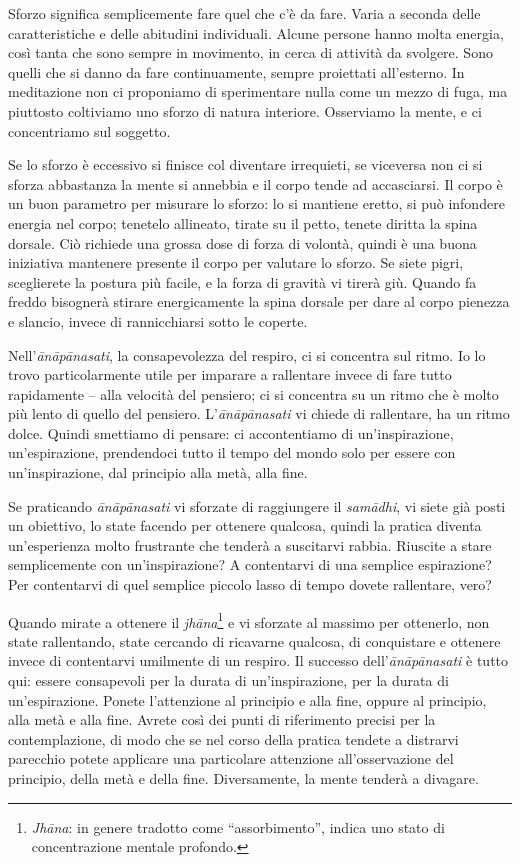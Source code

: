 
Sforzo significa semplicemente fare quel che c'è da fare. Varia a
seconda delle caratteristiche e delle abitudini individuali. Alcune
persone hanno molta energia, così tanta che sono sempre in movimento, in
cerca di attività da svolgere. Sono quelli che si danno da fare
continuamente, sempre proiettati all'esterno. In meditazione non ci
proponiamo di sperimentare nulla come un mezzo di fuga, ma piuttosto
coltiviamo uno sforzo di natura interiore. Osserviamo la mente, e ci
concentriamo sul soggetto.

Se lo sforzo è eccessivo si finisce col diventare irrequieti, se
viceversa non ci si sforza abbastanza la mente si annebbia e il corpo
tende ad accasciarsi. Il corpo è un buon parametro per misurare lo
sforzo: lo si mantiene eretto, si può infondere energia nel corpo;
tenetelo allineato, tirate su il petto, tenete diritta la spina dorsale.
Ciò richiede una grossa dose di forza di volontà, quindi è una buona
iniziativa mantenere presente il corpo per valutare lo sforzo. Se siete
pigri, sceglierete la postura più facile, e la forza di gravità vi
tirerà giù. Quando fa freddo bisognerà stirare energicamente la spina
dorsale per dare al corpo pienezza e slancio, invece di rannicchiarsi
sotto le coperte.

Nell'\textit{ānāpānasati}, la consapevolezza del respiro, ci si concentra sul
ritmo. Io lo trovo particolarmente utile per imparare a rallentare
invece di fare tutto rapidamente – alla velocità del pensiero; ci si
concentra su un ritmo che è molto più lento di quello del pensiero.
L'\textit{ānāpānasati} vi chiede di rallentare, ha un ritmo dolce. Quindi
smettiamo di pensare: ci accontentiamo di un'inspirazione,
un'espirazione, prendendoci tutto il tempo del mondo solo per essere con
un'inspirazione, dal principio alla metà, alla fine.

Se praticando \textit{ānāpānasati} vi sforzate di raggiungere il \textit{samādhi}, vi
siete già posti un obiettivo, lo state facendo per ottenere qualcosa,
quindi la pratica diventa un'esperienza molto frustrante che tenderà a
suscitarvi rabbia. Riuscite a stare semplicemente con un'inspirazione? A
contentarvi di una semplice espirazione? Per contentarvi di quel
semplice piccolo lasso di tempo dovete rallentare, vero?

Quando mirate a ottenere il \textit{jhāna}\footnote{\textit{Jhāna}: in genere tradotto come ``assorbimento”, indica
uno stato di concentrazione mentale profondo.} e vi sforzate al massimo
per ottenerlo, non state rallentando, state cercando di ricavarne
qualcosa, di conquistare e ottenere invece di contentarvi umilmente di
un respiro. Il successo dell'\textit{ānāpānasati} è tutto qui: essere consapevoli
per la durata di un'inspirazione, per la durata di un'espirazione.
Ponete l'attenzione al principio e alla fine, oppure al principio, alla
metà e alla fine. Avrete così dei punti di riferimento precisi per la
contemplazione, di modo che se nel corso della pratica tendete a
distrarvi parecchio potete applicare una particolare attenzione
all'osservazione del principio, della metà e della fine. Diversamente,
la mente tenderà a divagare.

